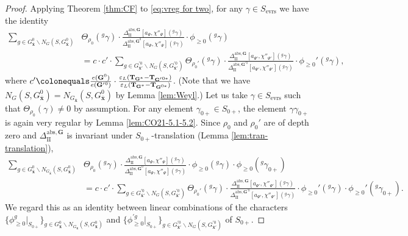 \documentclass{amsart}
\newcommand{\abs}{\mathrm{abs}}
\newcommand{\evrs}{\mathrm{evrs}}
\newcommand{\bfT}{\mathbf{T}}
\newcommand{\x}{\mathbf{x}}
\newcommand{\bfG}{\mathbf{G}}
\newcommand{\II}{\mathrm{II}}
\theoremstyle{plain}
\theoremstyle{definition}
\theoremstyle{remark}
\theoremstyle{theorem}
\begin{document}
\begin{proof}
    Applying Theorem \ref{thm:CF} to \eqref{eq:vreg for two}, for any $\gamma \in S_{\evrs}$ we have the identity  
    \begin{align*}
        \sum_{g \in G^{0}_{\bar{\x}}\backslash N_{G}(S,G^{0}_{\bar{\x}})}&\Theta_{\rho_{0}}({}^{g}\gamma)\cdot\frac{\Delta_{\II}^{\abs,\bfG}[a_{\Psi},\chi''_{\Psi}]({}^{g}\gamma)}{\Delta_{\II}^{\abs,\bfG^{0}}[a_{\Psi},\chi''_{\Psi}]({}^{g}\gamma)}\cdot\phi_{\geq0}({}^{g}\gamma) \\
        &=
        c \cdot c' \cdot
        \sum_{g \in G^{\prime 0}_{\bar{\x}'}\backslash N_{G}(S,G^{\prime 0}_{\bar{\x}'})}\Theta_{\rho_{0}'}({}^{g}\gamma)\cdot\frac{\Delta_{\II}^{\abs,\bfG}[a_{\Psi'},\chi''_{\Psi'}]({}^{g}\gamma)}{\Delta_{\II}^{\abs,\bfG^{\prime 0}}[a_{\Psi'},\chi''_{\Psi'}]({}^{g}\gamma)}\cdot\phi_{\geq0}'({}^{g}\gamma),
    \end{align*}
    where $c' \colonequals \frac{e(\bfG^0)}{e(\bfG'{}^{0})}\cdot \frac{\varepsilon_{L}(\bfT_{\bfG^{\ast}}-\bfT_{\bfG'{}^{0\ast}})}{\varepsilon_L(\bfT_{\bfG^*} - \bfT_{\bfG^{0\ast}})}$.
(Note that we have $N_{G}(S,G^{0}_{\bar{\x}})=N_{G_{\bar{\x}}}(S,G^{0}_{\bar{\x}})$ by Lemma \ref{lem:Weyl}.)
Let us take $\gamma\in S_{\evrs}$ such that $\Theta_{\rho_{0}}(\gamma)\neq0$ by assumption.
For any element $\gamma_{0+}\in S_{0+}$, the element $\gamma\gamma_{0+}$ is again very regular by Lemma \ref{lem:CO21-5.1-5.2}.
Since $\rho_0$ and $\rho_0'$ are of depth zero and $\Delta_{\II}^{\abs,\bfG}$ is invariant under $S_{0+}$-translation (Lemma \ref{lem:tran-translation}),
    \begin{align}\label{eq:0+ id}
        \sum_{g \in G^{0}_{\bar{\x}}\backslash N_{G_{\bar{\x}}}(S,G^{0}_{\bar{\x}})}&\Theta_{\rho_{0}}({}^{g}\gamma)\cdot\frac{\Delta_{\II}^{\abs,\bfG}[a_{\Psi},\chi''_{\Psi}]({}^{g}\gamma)}{\Delta_{\II}^{\abs,\bfG^{0}}[a_{\Psi},\chi''_{\Psi}]({}^{g}\gamma)}\cdot\phi_{\geq0}({}^{g}\gamma) \cdot \phi_{\geq 0}({}^{g} \gamma_{0+}) \\ \nonumber
        &=
        c \cdot c' \cdot
        \sum_{g \in G^{\prime 0}_{\bar{\x}'}\backslash N_{G}(S,G^{\prime 0}_{\bar{\x}'})}\Theta_{\rho_{0}'}({}^{g}\gamma)\cdot\frac{\Delta_{\II}^{\abs,\bfG}[a_{\Psi'},\chi''_{\Psi'}]({}^{g}\gamma)}{\Delta_{\II}^{\abs,\bfG^{\prime 0}}[a_{\Psi'},\chi''_{\Psi'}]({}^{g}\gamma)}\cdot\phi_{\geq0}'({}^{g}\gamma) \cdot \phi_{\geq 0}'({}^g \gamma_{0+}).
    \end{align}
    We regard this as an identity between linear combinations of the characters $\{\phi_{\geq 0}^{g}|_{S_{0+}}\}_{g \in G^{0}_{\bar{\x}}\backslash N_{G_{\bar{\x}}}(S,G^{0}_{\bar{\x}})}$ and $\{\phi_{\geq 0}^{\prime g}|_{S_{0+}}\}_{g \in G_{\bar{\x}'}^{\prime0} \backslash N_G(S,G_{\bar{\x}'}^{\prime0})}$ of $S_{0+}$. 

\end{proof}
\end{document}
